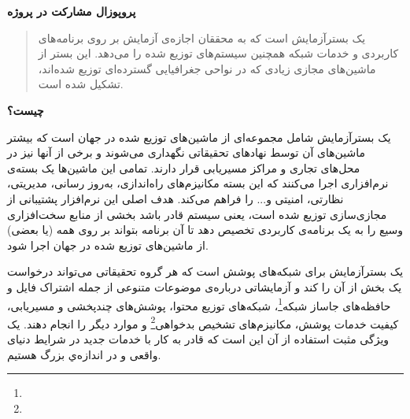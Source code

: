 \documentclass[11pt]{article}
\begin{document}
\thispagestyle{empty}

\bigskip
\bigskip

\centerline{\textbf{\Large{پروپوزال مشارکت در پروژه }}}

\bigskip
\bigskip



\bigskip


\bigskip 

\begin{abstract}
یک بسترآزمایش  است که به محققان اجازه‌ی آزمایش بر روی برنامه‌های کاربردی و خدمات شبکه همچنین سیستم‌های توزیع شده را می‌دهد. این بستر از ماشین‌های مجازی زیادی که در نواحی جغرافیایی گسترده‌ای توزیع شده‌اند، تشکیل شده است.



\end{abstract}

\bigskip

\noindent\textbf{ چیست؟}

 یک بسترآزمایش شامل مجموعه‌ای از ماشین‌های توزیع شده در جهان است که بیشتر ماشین‌های آن توسط نهادهای تحقیقاتی نگهداری می‌شوند و برخی از آنها نیز در محل‌های تجاری و مراکز مسیریابی قرار دارند. تمامی این ماشین‌ها یک بسته‌ی نرم‌افزاری اجرا می‌کنند که این بسته مکانیزم‌های راه‌اندازی، به‌روز رسانی، مدیریتی، نظارتی، امنیتی و... را فراهم می‌کند. هدف اصلی این نرم‌افزار پشتیبانی از مجازی‌سازی توزیع شده است، یعنی سیستم قادر باشد بخشی از منابع سخت‌افزاری وسیع  را به یک برنامه‌ی کاربردی تخصیص دهد تا آن برنامه بتواند بر روی همه (یا بعضی) از ماشین‌های توزیع شده در جهان اجرا شود.
 
یک بسترآزمایش برای شبکه‌های پوشش است که هر گروه تحقیقاتی می‌تواند درخواست یک بخش از آن را کند و آزمایشاتی درباره‌ی موضوعات متنوعی از جمله اشتراک فایل و حافظه‌های جاساز شبکه\footnote{}، شبکه‌های توزیع محتوا، پوشش‌های چندپخشی و مسیریابی، کیفیت خدمات پوشش، مکانیزم‌های تشخیص بدخواهی\footnote{} و موارد دیگر را انجام دهند. 
یک ویژگی مثبت استفاده از آن این است که قادر به کار با خدمات جدید در شرایط دنیای واقعی و در اندازه‌ي بزرگ هستیم.
\end{document}
